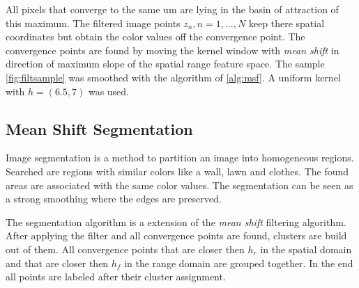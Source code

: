 All pixels that converge to the same um are lying in the basin of attraction
of this maximum. The filtered image points $z_n, n = 1 , \ldots , N$ keep there
spatial coordinates but obtain the color values off the convergence point. The
convergence points are found by moving the kernel window with \emph{mean shift} 
in direction of maximum slope of the spatial range feature space. The sample
\autoref{fig:filtsample} was smoothed with the algorithm of \autoref{alg:msf}. 
A uniform kernel with $h = (6.5, 7)$ was used.

\subsection{Mean Shift Segmentation} %
\label{sub:mean_shift_segmentation}
Image segmentation is a method to partition an image into homogeneous regions. 
Searched are regions with similar colors like a wall, lawn and clothes. 
The found areas are associated with the same color values. The segmentation 
can be seen as a strong smoothing where the edges are preserved. 

The segmentation algorithm is a extension of the \emph{mean shift } filtering
algorithm. After applying the filter and all convergence points are found,
clusters are build out of them. All convergence points that are closer then
$h_r$ in the spatial domain and that are closer then $h_f$ in the range domain
are grouped together. In the end all points are labeled after their cluster
assignment.

